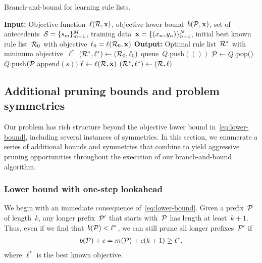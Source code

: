 \begin{algorithm}[t!]
\caption{Branch-and-bound for learning rule lists.}
\label{alg:branch-and-bound}
\begin{algorithmic}
\normalsize
\State \textbf{Input:} Objective function~$\ell({\mathcal R}, \mathbf{x})$, objective lower bound~${b({\mathcal P}, \mathbf{x})}$,
set of antecedents~${{\mathcal S} = \{s_m\}_{m=1}^M}$, training data~$\mathbf{x} = {\{(x_n, y_n)\}_{n=1}^N}$,
initial best known rule list~${\mathcal R}_0$ with objective~${\ell_0 = \ell({\mathcal R}_0, \mathbf{x})}$
\State \textbf{Output:} Optimal rule list~${\mathcal R}^*$ with minimum objective~$\ell^*$
\State $({\mathcal R}^*, \ell^*) \gets ({\mathcal R}_0, \ell_0)$ 
\State queue~$Q$.push$(())$ 
 
	\State ${\mathcal P} \gets Q$.pop() 
	 
         
            \State $Q$.push$({\mathcal P}$.append$(s))$ 
        \EndFor
        \State $\ell \gets \ell({\mathcal R}, \mathbf{x})$ 
        \If {$\ell < \ell^*$}
            \State $({\mathcal R}^*, \ell^*) \gets ({\mathcal R}, \ell)$ 
        \EndIf
    \EndIf
\EndWhile
\end{algorithmic}
\end{algorithm}

\subsection{Additional pruning bounds and problem symmetries}

Our problem has rich structure beyond the objective lower bound in~\eqref{eq:lower-bound},
including several instances of symmetries.
%
In this section, we enumerate a series of additional bounds and symmetries that
combine to yield aggressive pruning opportunities throughout the execution of
our branch-and-bound algorithm.

\subsubsection{Lower bound with one-step lookahead}

We begin with an immediate consequence of~\eqref{eq:lower-bound}.
%
Given a prefix~${\mathcal P}$ of length~$k$, any longer prefix~${\mathcal P}'$ that starts
with~${\mathcal P}$ has length at least~${k+1}$.
%
Thus, even if we find that~${b({\mathcal P}) < \ell^*}$, we can still prune all longer
prefixes~${\mathcal P}'$ if
\begin{align}
b(\Prefix) + c = m(\Prefix) + c (k + 1) \ge \ell^*,
\end{align}
where $\ell^*$ is the best known objective.

